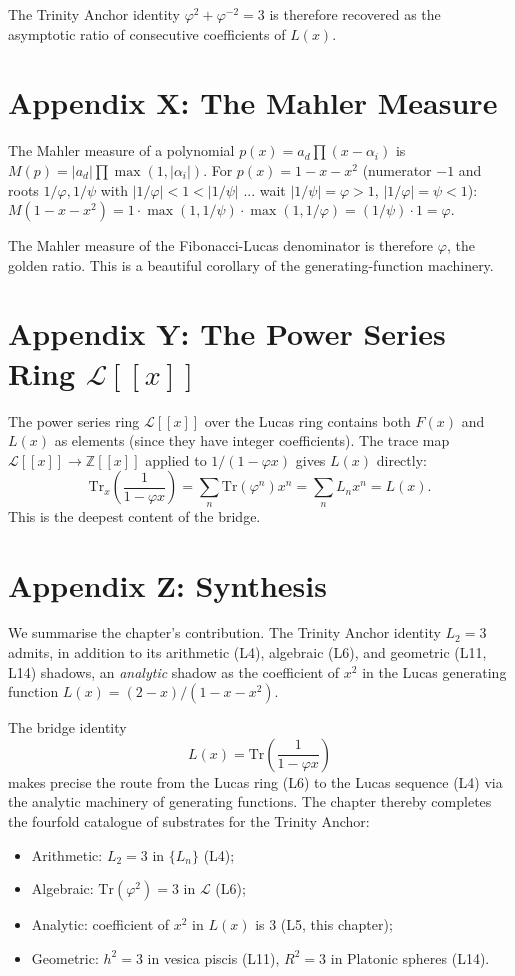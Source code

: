The Trinity Anchor identity $\varphi^2 + \varphi^{-2} = 3$ is therefore
recovered as the asymptotic ratio of consecutive coefficients of $L(x)$.

\section*{Appendix X: The Mahler Measure}
\label{sec:05-app-X}

The Mahler measure of a polynomial $p(x) = a_d \prod (x - \alpha_i)$
is $M(p) = |a_d| \prod \max(1, |\alpha_i|)$. For $p(x) = 1 - x - x^2$
(numerator $-1$ and roots $1/\varphi, 1/\psi$ with $|1/\varphi| < 1 < |1/\psi|$
... wait $|1/\psi| = \varphi > 1$, $|1/\varphi| = \psi < 1$):
$M(1 - x - x^2) = 1 \cdot \max(1, 1/\psi) \cdot \max(1, 1/\varphi) = (1/\psi) \cdot 1 = \varphi$.

The Mahler measure of the Fibonacci-Lucas denominator is therefore
$\varphi$, the golden ratio. This is a beautiful corollary of the
generating-function machinery.

\section*{Appendix Y: The Power Series Ring $\mathcal{L}[[x]]$}
\label{sec:05-app-Y}

The power series ring $\mathcal{L}[[x]]$ over the Lucas ring contains
both $F(x)$ and $L(x)$ as elements (since they have integer
coefficients). The trace map $\mathcal{L}[[x]] \to \mathbb{Z}[[x]]$
applied to $1/(1 - \varphi x)$ gives $L(x)$ directly:
\[
  \mathrm{Tr}_x\left(\frac{1}{1 - \varphi x}\right)
  = \sum_n \mathrm{Tr}(\varphi^n) x^n
  = \sum_n L_n x^n
  = L(x).
\]
This is the deepest content of the bridge.

\section*{Appendix Z: Synthesis}
\label{sec:05-app-Z}

We summarise the chapter's contribution. The Trinity Anchor identity
$L_2 = 3$ admits, in addition to its arithmetic (L4), algebraic (L6),
and geometric (L11, L14) shadows, an \emph{analytic} shadow as the
coefficient of $x^2$ in the Lucas generating function $L(x) = (2-x)/(1-x-x^2)$.

The bridge identity
\[
  L(x) = \mathrm{Tr}\left(\frac{1}{1 - \varphi x}\right)
\]
makes precise the route from the Lucas ring (L6) to the Lucas
sequence (L4) via the analytic machinery of generating functions.
The chapter thereby completes the fourfold catalogue of substrates
for the Trinity Anchor:
\begin{itemize}
  \item Arithmetic: $L_2 = 3$ in $\{L_n\}$ (L4);
  \item Algebraic: $\mathrm{Tr}(\varphi^2) = 3$ in $\mathcal{L}$ (L6);
  \item Analytic: coefficient of $x^2$ in $L(x)$ is $3$ (L5, this chapter);
  \item Geometric: $h^2 = 3$ in vesica piscis (L11), $R^2 = 3$ in Platonic spheres (L14).
\end{itemize}

